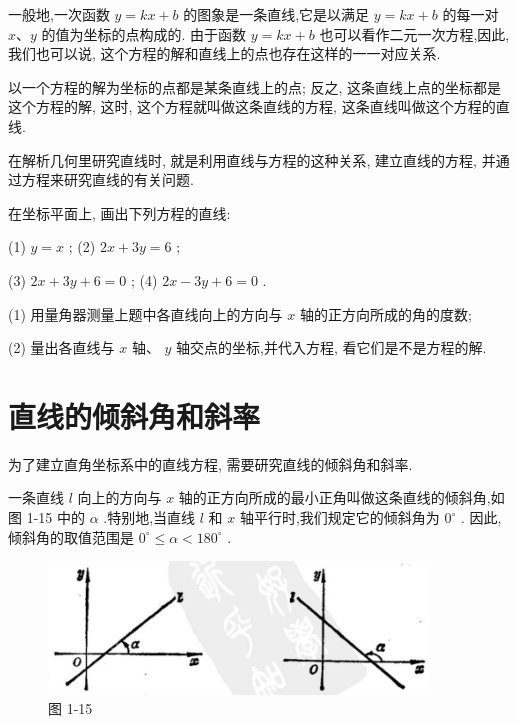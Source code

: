 \documentclass[lang=cn,newtx,10pt,scheme=chinese]{elegantbook}
\begin{document}
一般地,一次函数 \(y = {kx} + b\) 的图象是一条直线,它是以满足 \(y = {kx} + b\) 的每一对 \(x\text{、}y\) 的值为坐标的点构成的. 由于函数 \(y = {kx} + b\) 也可以看作二元一次方程,因此,我们也可以说, 这个方程的解和直线上的点也存在这样的一一对应关系.
\begin{corollary}[直线与方程的关系]
以一个方程的解为坐标的点都是某条直线上的点; 反之, 这条直线上点的坐标都是这个方程的解, 这时, 这个方程就叫做这条直线的方程, 这条直线叫做这个方程的直线.
\end{corollary}

在解析几何里研究直线时, 就是利用直线与方程的这种关系, 建立直线的方程, 并通过方程来研究直线的有关问题.

\begin{problemset}[练习]

\item 在坐标平面上, 画出下列方程的直线:

(1) \(y = x\) ; (2) \({2x} + {3y} = 6\) ;

(3) \({2x} + {3y} + 6 = 0\) ; (4) \({2x} - {3y} + 6 = 0\) .

\item (1) 用量角器测量上题中各直线向上的方向与 \(x\) 轴的正方向所成的角的度数;

(2) 量出各直线与 \(x\) 轴、 \(y\) 轴交点的坐标,并代入方程, 看它们是不是方程的解.
\end{problemset}

\section{直线的倾斜角和斜率}

为了建立直角坐标系中的直线方程, 需要研究直线的倾斜角和斜率.

\begin{definition}[倾斜角]
一条直线 \(l\) 向上的方向与 \(x\) 轴的正方向所成的最小正角叫做这条直线的倾斜角,如图 1-15 中的 \(\alpha\) .特别地,当直线 \(l\) 和 \(x\) 轴平行时,我们规定它的倾斜角为 \({0}^{ \circ }\) . 因此,倾斜角的取值范围是 \({0}^{ \circ } \leq \alpha < {180}^{ \circ }\) .
\end{definition}


\begin{figure}[h]
  \centering
  \includegraphics[max width=0.9\textwidth]{images/01912cc2-ffb6-728e-9ae7-b113ff05c64b_19_823562.jpg}
  \caption{图 1-15}
\end{figure}
\end{document}
